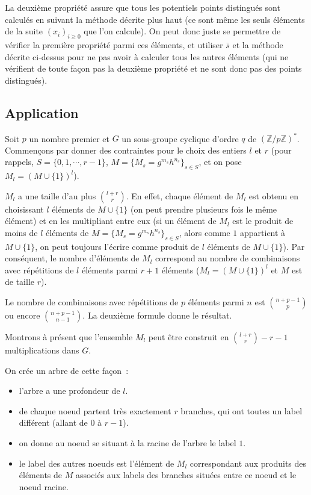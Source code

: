 		La deuxième propriété assure que tous les potentiels points distingués sont calculés en suivant la méthode décrite plus haut (ce sont même les seuls éléments de la suite $(x_i)_{i \ge 0}$ que l'on calcule). On peut donc juste se permettre de vérifier la première propriété parmi ces éléments, et utiliser $\overline{s}$ et la méthode décrite ci-dessus pour ne pas avoir à calculer tous les autres éléments (qui ne vérifient de toute façon pas la deuxième propriété et ne sont donc pas des points distingués).
		
		\subsection{Application}
		Soit $p$ un nombre premier et $G$ un sous-groupe cyclique d'ordre $q$ de $(\mathbb{Z}/p\mathbb{Z})^*$. Commençons par donner des contraintes pour le choix des entiers $l$ et $r$ (pour rappels, $S = \{0,1,\cdots,r-1\}$, $M=\{M_s = g^{m_s} h^{n_s}\}_{s \in S}$, et on pose $M_l = (M\cup\{1\})^l$).
		
		$M_l$ a une taille d'au plus $\binom{l+r}{r}$. En effet, chaque élément de $M_l$ est obtenu en choisissant $l$ éléments de $M\cup\{1\}$ (on peut prendre plusieurs fois le même élément) et en les multipliant entre eux (si un élément de $M_l$ est le produit de moins de $l$ éléments de $M = \{M_s = g^{m_s} h^{n_s}\}_{s \in S}$, alors comme $1$ appartient à $M\cup\{1\}$, on peut toujours l'écrire comme produit de $l$ éléments de $M\cup\{1\}$). Par conséquent, le nombre d'éléments de $M_l$ correspond au nombre de combinaisons avec répétitions de $l$ éléments parmi $r + 1$ éléments ($M_l = (M\cup\{1\})^l$ et $M$ est de taille $r$).
		
		Le nombre de combinaisons avec répétitions de $p$ éléments parmi $n$ est $\binom{n+p-1}{p}$ ou encore $\binom{n+p-1}{n-1}$. La deuxième formule donne le résultat.
		
		Montrons à présent que l'ensemble $M_l$ peut être construit en $\binom{l+r}{r} - r - 1$ multiplications dans $G$.
		
		On crée un arbre de cette façon~:
		
		\begin{itemize}
		\item l'arbre a une profondeur de $l$.
		\item de chaque noeud partent très exactement $r$ branches, qui ont toutes un label différent (allant de $0$ à $r - 1$).
		\item on donne au noeud se situant à la racine de l'arbre le label $1$.
		\item le label des autres noeuds est l'élément de $M_l$ correspondant aux produits des éléments de $M$ associés aux labels des branches situées entre ce noeud et le noeud racine.
		\end{itemize}
		
